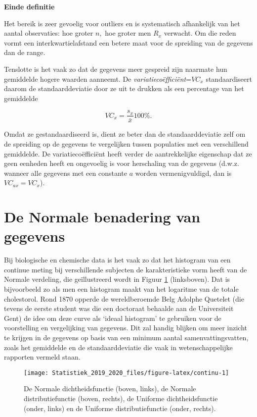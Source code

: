 \documentclass[12pt,dutch,coursenotes]{book}
\theoremstyle{definition}
\theoremstyle{definition}
\theoremstyle{definition}
\theoremstyle{remark}
\begin{document}
\textbf{Einde definitie}

Het bereik is zeer gevoelig voor outliers en is systematisch afhankelijk
van het aantal observaties: hoe groter \(n,\) hoe groter men \(R_x\)
verwacht. Om die reden vormt een interkwartielafstand een betere maat
voor de spreiding van de gegevens dan de range.

Tenslotte is het vaak zo dat de gegevens meer gespreid zijn naarmate hun
gemiddelde hogere waarden aanneemt. De
\emph{variatiecoëfficiënt}=\(VC_x\) standaardiseert daarom de
standaarddeviatie door ze uit te drukken als een percentage van het
gemiddelde

\begin{equation*}
VC_x = \frac{s_x}{\bar{x}} 100\%.
\end{equation*}

Omdat ze gestandaardiseerd is, dient ze beter dan de standaarddeviatie
zelf om de spreiding op de gegevens te vergelijken tussen populaties met
een verschillend gemiddelde. De variatiecoëfficiënt heeft verder de
aantrekkelijke eigenschap dat ze geen eenheden heeft en ongevoelig is
voor herschaling van de gegevens (d.w.z. wanneer alle gegevens met een
constante \(a\) worden vermenigvuldigd, dan is \(VC_{ax}=VC_x\)).

\section{De Normale benadering van gegevens}\label{sec:normal}

Bij biologische en chemische data is het vaak zo dat het histogram van
een continue meting bij verschillende subjecten de karakteristieke vorm
heeft van de Normale verdeling, die geïllustreerd wordt in Figuur
\ref{fig:continu} (linksboven). Dat is bijvoorbeeld zo als men een
histogram maakt van het logaritme van de totale cholestorol. Rond 1870
opperde de wereldberoemde Belg Adolphe Quetelet (die tevens de eerste
student was die een doctoraat behaalde aan de Universiteit Gent) de idee
om deze curve als `ideaal histogram' te gebruiken voor de voorstelling
en vergelijking van gegevens. Dit zal handig blijken om meer inzicht te
krijgen in de gegevens op basis van een minimum aantal
samenvattingsvatten, zoals het gemiddelde en de standaarddeviatie die
vaak in wetenschappelijke rapporten vermeld staan.

\begin{figure}

{\centering \texttt{[image: Statistiek\_2019\_2020\_files/figure-latex/continu-1]} 

}

\caption{De Normale dichtheidsfunctie (boven, links), de Normale distributiefunctie (boven, rechts), de Uniforme dichtheidsfunctie (onder, links) en de Uniforme distributiefunctie (onder, rechts).}\label{fig:continu}
\end{figure}
\end{document}
